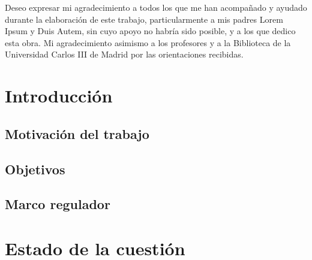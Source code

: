 \documentclass[12pt]{report} %
\begin{document}
\setcounter{page}{5}
	
	Deseo expresar mi agradecimiento a todos los que me han acompañado y ayudado durante la elaboración de este trabajo, particularmente a mis padres Lorem Ipsum y Duis Autem,
	sin cuyo apoyo no habría sido posible, y a los que dedico esta obra. Mi agradecimiento asimismo a los profesores y a la Biblioteca de la Universidad Carlos III de Madrid por las 
	orientaciones recibidas.	
		
	\vfill
	
	\newpage %
	\thispagestyle{empty}
	\mbox{}
	


\tableofcontents
\thispagestyle{fancy}

\newpage %
\thispagestyle{empty}
\mbox{}

\listoffigures
\thispagestyle{fancy}

\newpage %
\thispagestyle{empty}
\mbox{}

\listoftables
\thispagestyle{fancy}

\newpage %
\thispagestyle{empty}
\mbox{}


\clearpage
{} %

\chapter{Introducción}

\section{Motivación del trabajo}
\lipsum[1-3]

\section{Objetivos}
\lipsum[1-2]

\section{Marco regulador}
\lipsum[5-6]


\chapter{Estado de la cuestión}
\end{document}
